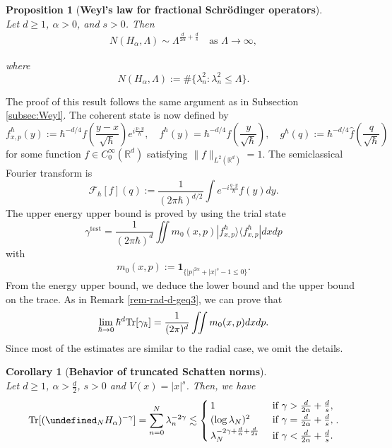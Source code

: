 \documentclass[%
11pt,  reqno]{amsart}
\newtheorem{proposition}[theorem]{Proposition}
\newtheorem{corollary}[theorem]{Corollary}
\theoremstyle{remarkstyle}
\newcommand{\1}{\hspace{0.2mm}\text{I}\hspace{0.2mm}}
\newcommand{\noi}{\noindent}
\newcommand{\R}{\mathbb{R}}
\let\P= \undefined
\newcommand{\P}{\mathbf{P}}
\newcommand{\al}{\alpha}
\newcommand{\eps}{\varepsilon}
\newcommand{\g}{\gamma}
\newcommand{\ld}{\lambda}
\newcommand{\Ld}{\Lambda}
\newcommand{\les}{\lesssim}
\newcommand{\ind}{\mathbf 1}
\DeclareMathOperator*{\test}{test}
\numberwithin{equation}{section}
\numberwithin{theorem}{section}
\begin{document}
	\begin{proposition}[\bf Weyl's law for fractional Schr\"odinger operators] \mbox{} \\
		Let $d\geq 1$, $\alpha>0$, and $s>0$. Then 
		\begin{align} \label{CLR-frac}
			N(H_\alpha, \Lambda) \sim \Lambda^{\frac{d}{2\alpha}+\frac{d}{s}} \quad \text{as } \Lambda \to \infty,
		\end{align}
		
		\noi
		where 
		$$
		N(H_\al, \Ld):= \#\{\ld_n^2 : \ld_n^2 \le \Ld\}.
		$$
	\end{proposition}
	
	The proof of this result follows the same argument as in Subsection \ref{subsec:Weyl}. The coherent state is now defined by
	\[
	f^{\hbar}_{x,p}(y):=\hbar^{-d/4} f\left(\frac{y-x}{\sqrt{\hbar}}\right) e^{i\frac{p\cdot y}{\hbar}}, \quad f^\hbar(y) = \hbar^{-d/4} f\left(\frac{y}{\sqrt{\hbar}}\right), \quad g^{\hbar}(q):=\hbar^{-d/4} \hat{f}\left(\frac{q}{\sqrt{\hbar}}\right)
	\] 
	for some function $f\in C^\infty_0(\R^d)$  satisfying $\|f\|_{L^2(\R^d)} =1$. The semiclassical Fourier transform is
	\[
	\mathcal F_{\hbar}[f](q):=\frac{1}{(2\pi\hbar)^{d/2}} \int e^{-i\frac{q\cdot y}{\hbar}} f(y) dy.
	\]
	The upper energy upper bound is proved by using the trial state
	\[
	\gamma^{\test} = \frac{1}{(2\pi\hbar)^d} \iint m_0(x,p) |f^{\hbar}_{x,p}\rangle \langle f^{\hbar}_{x,p}| dxdp
	\]
	with
	\begin{align} \label{m1-frac}
		m_0(x,p):= \ind_{\{|p|^{2\alpha}+|x|^s-1\leq 0\}}.
	\end{align}
	From the energy upper bound, we deduce the lower bound and the upper bound on the trace. As in Remark \ref{rem-rad-d-geq3}, we can prove that 
	\begin{align*} 
		\lim_{\hbar \to 0} \hbar^d {\rm Tr}[\gamma_\hbar] = \frac{1}{(2\pi)^d} \iint m_0(x,p) dxdp.
	\end{align*}
	Since most of the estimates are similar to the radial case, we omit the details. 
	
	
	
	\begin{corollary}
		[\bf Behavior of truncated Schatten norms]
		\label{COR:LS} \mbox{} \\
		Let $d\ge 1$, $\al>\frac{d}{2}$, $s>0$ and $V(x) = |x|^s$. Then, we have
		\begin{align*} 
			{\rm Tr} [(\P_NH_\al)^{-\g}] = \sum_{n=0}^N \ld_n^{-2\g} \les \begin{cases}
				1 &\text{ if } \g > \frac{d}{2\al} + \frac{d}{s}, \\
				(\log \ld_N)^2 &\text{ if } \g = \frac{d}{2\al} + \frac{d}{s}, \\
				\ld_N^{-2\g + \frac{d}{\al} + \frac{d}{2s}} &\text{ if } \g <\frac{d}{2\al} +\frac{d}{s}.
			\end{cases}.
		\end{align*}
	\end{corollary}
	
\end{document}
